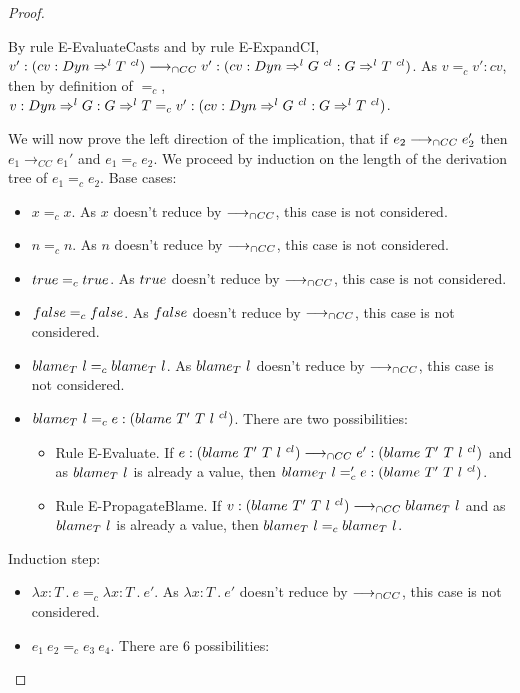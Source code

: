 \documentclass[a4paper]{article}
\begin{document}
\begin{proof}
\begin{itemize}
\begin{itemize}
        By rule E-EvaluateCasts and by rule E-ExpandCI, $v' : (cv : Dyn \Rightarrow^l T\ ^{cl}) \longrightarrow_{\cap CC} v' : (cv : Dyn \Rightarrow^l G\ ^{cl} : G \Rightarrow^l T\ ^{cl})$.
        As $v =_c v' : cv$, then by definition of $=_c$, $v : \Dyn \Rightarrow^l G : G \Rightarrow^l T =_c v' : (cv : \Dyn \Rightarrow^l G\ ^{cl} : G \Rightarrow^l T\ ^{cl})$.
    \end{itemize}
\end{itemize}
We will now prove the left direction of the implication, that if $e_2 \longrightarrow_{\cap CC} e_2'$ then $e_1 \longrightarrow_{CC} e_1'$ and $e_1 =_{c} e_2$.
We proceed by induction on the length of the derivation tree of $e_1 =_c e_2$.
Base cases:
\begin{itemize}
    \item $x =_c x$.
    As $x$ doesn't reduce by $\longrightarrow_{\cap CC}$, this case is not considered.
    \item $n =_c n$.
    As $n$ doesn't reduce by $\longrightarrow_{\cap CC}$, this case is not considered.
    \item $true =_c true$.
    As $true$ doesn't reduce by $\longrightarrow_{\cap CC}$, this case is not considered.
    \item $false =_c false$.
    As $false$ doesn't reduce by $\longrightarrow_{\cap CC}$, this case is not considered.
    \item $blame_{T}\ l =_c blame_{T}\ l$.
    As $blame_{T}\ l$ doesn't reduce by $\longrightarrow_{\cap CC}$, this case is not considered.
    \item $blame_{T}\ l =_c e : (blame\ T'\ T\ l\ ^{cl})$.
    There are two possibilities:
    \begin{itemize}
        \item Rule E-Evaluate.
        If $e : (blame\ T'\ T\ l\ ^{cl}) \longrightarrow_{\cap CC} e' : (blame\ T'\ T\ l\ ^{cl})$ and as $blame_{T}\ l$ is already a value, then $blame_{T}\ l =_c 'e : (blame\ T'\ T\ l\ ^{cl})$.
        \item Rule E-PropagateBlame.
        If $v : (blame\ T'\ T\ l\ ^{cl}) \longrightarrow_{\cap CC} blame_{T}\ l$ and as $blame_{T}\ l$ is already a value, then $blame_{T}\ l =_c blame_{T}\ l$.
    \end{itemize}
\end{itemize}
Induction step:
\begin{itemize}
    \item $\lambda x : T\ .\ e =_c \lambda x : T\ .\ e'$.
    As $\lambda x : T\ .\ e'$ doesn't reduce by $\longrightarrow_{\cap CC}$, this case is not considered.
    \item $e_1\ e_2 =_c e_3\ e_4$.
    There are 6 possibilities:
    \begin{itemize}

\end{itemize}
\end{itemize}
\end{proof}
\end{document}
